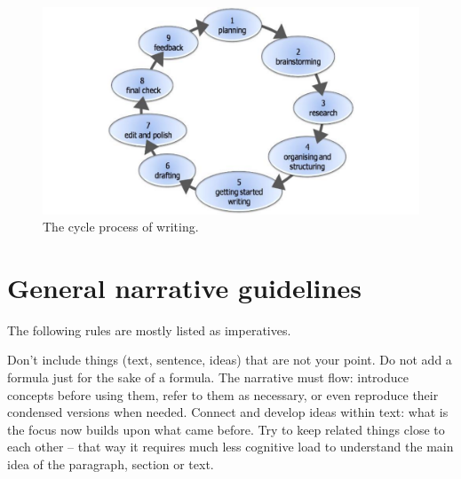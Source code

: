 \documentclass[10pt,a4paper,twocolumn]{article}
\begin{document}
\begin{figure}
  \centering
  \includegraphics[width=\columnwidth]{assets/iterative_process.pdf}
  \caption{
    The cycle process of writing.
  }
\end{figure}


\section{General narrative guidelines} %
\label{sec:general_narrative_guidelines}

The following rules are mostly listed as imperatives.

Don't include things (text, sentence, ideas) that are not your point. Do not add a formula
just for the sake of a formula. The narrative must flow: introduce concepts before using
them, refer to them as necessary, or even reproduce their condensed versions when needed.
Connect and develop ideas within text: what is the focus now builds upon what came before.
Try to keep related things close to each other -- that way it requires much less cognitive
load to understand the main idea of the paragraph, section or text.

\end{document}
